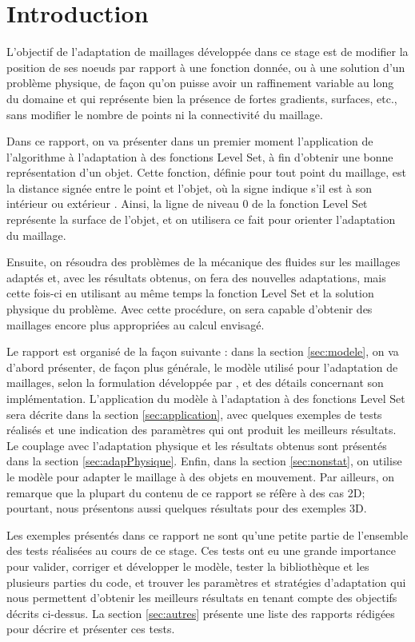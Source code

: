 \section{Introduction}

\indent L'objectif de l'adaptation de maillages développée dans ce stage est de modifier la position de ses noeuds par rapport à une fonction donnée, ou à une solution d'un problème physique, de façon qu'on puisse avoir un raffinement variable au long du domaine et qui représente bien la présence de fortes gradients, surfaces, etc., sans modifier le nombre de points ni la connectivité du maillage.

\indent Dans ce rapport, on va présenter dans un premier moment l'application de l'algorithme à l'adaptation à des fonctions Level Set, à fin d'obtenir une bonne représentation d'un objet. Cette fonction, définie pour tout point du maillage, est la distance signée entre le point et l'objet, où la signe indique s'il est à son intérieur ou extérieur \cite{ducrot}. Ainsi, la ligne de niveau 0 de la fonction Level Set représente la surface de l'objet, et on utilisera ce fait pour orienter l'adaptation du maillage.

\indent Ensuite, on résoudra des problèmes de la mécanique des fluides sur les maillages adaptés et, avec les résultats obtenus, on fera des nouvelles adaptations, mais cette fois-ci en utilisant au même temps la fonction Level Set et la solution physique du problème. Avec cette procédure, on sera capable d'obtenir des maillages encore plus appropriées au calcul envisagé. 

\indent Le rapport est organisé de la façon suivante : dans la section \ref{sec:modele}, on va d'abord présenter, de façon plus générale, le modèle utilisé pour l'adaptation de maillages, selon la formulation développée par \cite{arpaia}, et des détails concernant son implémentation. L'application du modèle à l'adaptation à des fonctions Level Set sera décrite dans la section \ref{sec:application}, avec quelques exemples de tests réalisés et une indication des paramètres qui ont produit les meilleurs résultats. Le couplage avec l'adaptation physique et les résultats obtenus sont présentés dans la section \ref{sec:adapPhysique}. Enfin, dans la section \ref{sec:nonstat}, on utilise le modèle pour adapter le maillage à des objets en mouvement. Par ailleurs, on remarque que la plupart du contenu de ce rapport se réfère à des cas 2D; pourtant, nous présentons aussi quelques résultats pour des exemples 3D.

\indent Les exemples présentés dans ce rapport ne sont qu'une petite partie de l'ensemble des tests réalisées  au cours de ce stage. Ces tests ont eu une grande importance pour valider, corriger et développer le modèle,  tester la bibliothèque et les plusieurs parties du code, et trouver les paramètres et stratégies d'adaptation qui nous permettent d'obtenir les meilleurs résultats en tenant compte des objectifs décrits ci-dessus. La section \ref{sec:autres} présente une liste des rapports rédigées pour décrire et présenter ces tests.